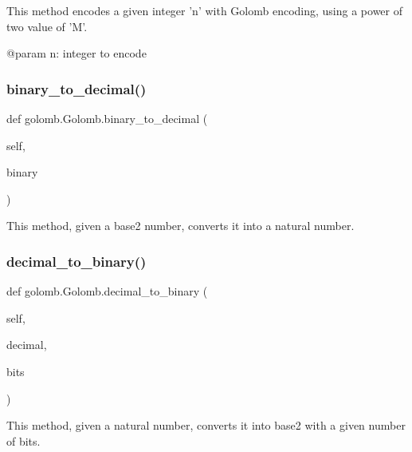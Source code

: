 \begin{DoxyVerb}This method encodes a given integer 'n' with Golomb encoding, using a power of two value of 'M'.

@param n: integer to encode
\end{DoxyVerb}
 \mbox{\label{classgolomb_1_1Golomb_a2e6f6f529b979dce3c4eaa1f987eba5b}} 
\subsubsection{\texorpdfstring{binary\+\_\+to\+\_\+decimal()}{binary\_to\_decimal()}}
{\footnotesize\ttfamily def golomb.\+Golomb.\+binary\+\_\+to\+\_\+decimal (\begin{DoxyParamCaption}\item[{}]{self,  }\item[{}]{binary }\end{DoxyParamCaption})}

\begin{DoxyVerb}This method, given a base2 number, converts it into a natural number.
\end{DoxyVerb}
 \mbox{\label{classgolomb_1_1Golomb_a2023173c3c88626f503a788ccd127ed2}} 
\subsubsection{\texorpdfstring{decimal\+\_\+to\+\_\+binary()}{decimal\_to\_binary()}}
{\footnotesize\ttfamily def golomb.\+Golomb.\+decimal\+\_\+to\+\_\+binary (\begin{DoxyParamCaption}\item[{}]{self,  }\item[{}]{decimal,  }\item[{}]{bits }\end{DoxyParamCaption})}

\begin{DoxyVerb}This method, given a natural number, converts it into base2 with a given number of bits.
\end{DoxyVerb}
 \mbox{\label{classgolomb_1_1Golomb_a3517240011034723c1bea63884b8c66c}} 
